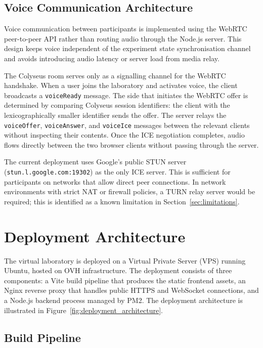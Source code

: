 \subsection{Voice Communication Architecture}
\label{sec:voice_architecture}

Voice communication between participants is implemented using the WebRTC
peer-to-peer API rather than routing audio through the Node.js server.
This design keeps voice independent of the experiment state
synchronisation channel and avoids introducing audio latency or server
load from media relay.

The Colyseus room serves only as a signalling channel for the WebRTC
handshake. When a user joins the laboratory and activates voice, the
client broadcasts a \texttt{voiceReady} message. The side that initiates
the WebRTC offer is determined by comparing Colyseus session identifiers:
the client with the lexicographically smaller identifier sends the offer.
The server relays the \texttt{voiceOffer}, \texttt{voiceAnswer}, and
\texttt{voiceIce} messages between the relevant clients without
inspecting their contents. Once the ICE negotiation completes, audio
flows directly between the two browser clients without passing through
the server.

The current deployment uses Google's public STUN server
(\texttt{stun.l.google.com:19302}) as the only ICE server. This is
sufficient for participants on networks that allow direct peer connections.
In network environments with strict NAT or firewall policies, a TURN
relay server would be required; this is identified as a known limitation
in Section~\ref{sec:limitations}.



\section{Deployment Architecture}
\label{sec:deployment_architecture}

The virtual laboratory is deployed on a Virtual Private Server (VPS)
running Ubuntu, hosted on OVH infrastructure. The deployment consists of
three components: a Vite build pipeline that produces the static frontend
assets, an Nginx reverse proxy that handles public HTTPS and WebSocket
connections, and a Node.js backend process managed by PM2. The
deployment architecture is illustrated in
Figure~\ref{fig:deployment_architecture}.

\subsection{Build Pipeline}
\label{sec:build_pipeline}

